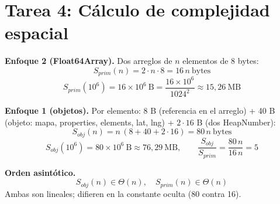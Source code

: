 \documentclass[11pt]{article}
\begin{document}
\section*{Tarea 4: C\'alculo de complejidad espacial}
\textbf{Enfoque 2 (Float64Array).} Dos arreglos de $n$ elementos de 8 bytes:
\[ S_{prim}(n)=2\cdot n\cdot 8 = 16\,n\ \text{bytes} \]
\[ S_{prim}(10^6)=16\times10^6\ \text{B}=\frac{16\times10^6}{1024^2}\approx 15{,}26\ \text{MB} \]

\textbf{Enfoque 1 (objetos).} Por elemento: 8 B (referencia en el arreglo) + 40 B (objeto: mapa, properties, elements, lat, lng) + $2\cdot16$ B (dos HeapNumber):
\[ S_{obj}(n)=n\,(8+40+2\cdot16)=80\,n\ \text{bytes} \]
\[ S_{obj}(10^6)=80\times10^6\ \text{B}\approx 76{,}29\ \text{MB},\qquad \frac{S_{obj}}{S_{prim}}=\frac{80\,n}{16\,n}=5 \]

\textbf{Orden asint\'otico.}
\[ S_{obj}(n)\in\Theta(n),\quad S_{prim}(n)\in\Theta(n) \]
Ambas son lineales; difieren en la constante oculta (80 contra 16).
\end{document}
